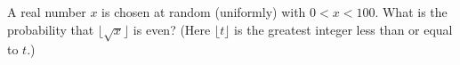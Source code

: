 A real number $x$ is chosen at random (uniformly) with $0<x<100$. What is the probability that $\lfloor\sqrt{x}\rfloor$ is even? (Here $\lfloor t\rfloor$ is the greatest integer less than or equal to $t$.)
